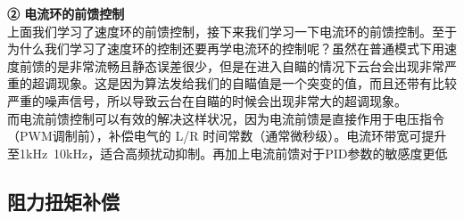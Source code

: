 \documentclass[UTF8,a4paper,12pt]{ctexart}
\begin{document}
        \textbf{② 电流环的前馈控制}\\
        上面我们学习了速度环的前馈控制，接下来我们学习一下电流环的前馈控制。至于为什么我们学习了速度环的控制还要再学电流环的控制呢？虽然在普通模式下用速度前馈的是非常流畅且静态误差很少，但是在进入自瞄的情况下云台会出现非常严重的超调现象。这是因为算法发给我们的自瞄值是一个突变的值，而且还带有比较严重的噪声信号，所以导致云台在自瞄的时候会出现非常大的超调现象。\\
        而电流前馈控制可以有效的解决这样状况，因为电流前馈是直接作用于电压指令（PWM调制前），补偿电气的 L/R 时间常数（通常微秒级）。电流环带宽可提升至1kHz~10kHz，适合高频扰动抑制。再加上电流前馈对于PID参数的敏感度更低

        \subsection{阻力扭矩补偿}
\end{document}
